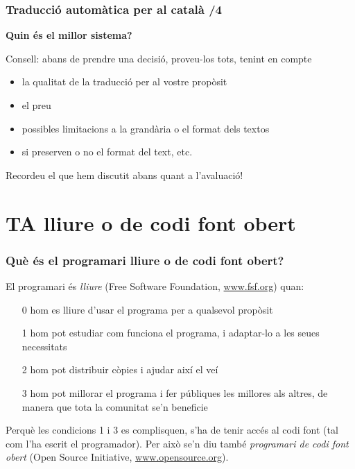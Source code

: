 \documentclass{beamer}
\newcommand{\empha}[1]{\emph{#1}\/}
\begin{document}
\begin{frame}
  \frametitle{Traducció automàtica per al català /4}

\textbf{Quin és el millor sistema?}

Consell: abans de prendre una decisió, proveu-los tots, tenint en compte
\begin{itemize}
\item la qualitat de la traducció per al vostre propòsit
\item el preu
\item possibles limitacions a la grandària o el format dels textos
\item si preserven o no el format del text, etc.
\end{itemize}
Recordeu el que hem discutit abans quant a l'avaluació!
\end{frame}


\section[Traducció automàtica lliure]{TA lliure o de codi font obert}


\begin{frame}
\frametitle{Què és el programari lliure o de codi font obert?}
El programari és \empha{lliure} (Free Software Foundation, \url{www.fsf.org}) quan:
\begin{itemize}
\item[0] hom es lliure d'usar el programa per a qualsevol propòsit
\item[1] hom pot estudiar com funciona el programa, i adaptar-lo a les seues necessitats
\item[2] hom pot distribuir còpies i ajudar així el veí
\item[3] hom pot millorar el programa i fer públiques les millores als altres, de manera que tota la comunitat se'n beneficie
\end{itemize}
Perquè les condicions 1 i 3 es complisquen, s'ha de tenir accés al codi font (tal com l'ha escrit el programador). Per això se'n diu també \empha{programari de codi font obert} (Open Source Initiative, \url{www.opensource.org}).
\end{frame}

\end{document}
